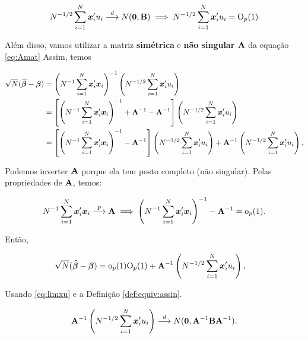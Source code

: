 \documentclass[11pt, oneside, a4paper, article]{article}
\numberwithin{equation}{section}
\begin{document}
\vspace{-1 em}
\begin{align} \label{eq:limxu}
N^{-1/2} \sum_{i=1}^{N} \boldsymbol{x}_{i}' u_{i}  \overset{d}{\longrightarrow}  N(\boldsymbol{0}, \mathbf{B})
\implies
N^{-1/2} \sum_{i=1}^{N} \boldsymbol{x}_{i}' u_{i} = \text{O}_{p}(1)
\end{align}

\vspace{1 em}
Além disso, vamos utilizar a matriz \textbf{simétrica} e \textbf{não singular} $\mathbf{A}$ da equação \eqref{eq:Amat}
Assim, temos 

\vspace{-1 em}
\begin{align*}
\sqrt{N} (\widehat{\boldsymbol{\beta}} - \boldsymbol{\beta}) &=
\left( N^{-1} \sum_{i=1}^{N} \boldsymbol{x}_{i}' \boldsymbol{x}_{i} \right)^{-1}
\left( N^{-1/2} \sum_{i=1}^{N} \boldsymbol{x}_{i}' u_{i} \right)
\\ &=
\left[ 
\left( N^{-1} \sum_{i=1}^{N} \boldsymbol{x}_{i}' \boldsymbol{x}_{i} \right)^{-1} 
+ \mathbf{A}^{-1} - \mathbf{A}^{-1}
\right]
\left( N^{-1/2} \sum_{i=1}^{N} \boldsymbol{x}_{i}' u_{i} \right)
\\ &=
\left[ 
\left( N^{-1} \sum_{i=1}^{N} \boldsymbol{x}_{i}' \boldsymbol{x}_{i} \right)^{-1} 
- \mathbf{A}^{-1}
\right]
\left( N^{-1/2} \sum_{i=1}^{N} \boldsymbol{x}_{i}' u_{i} \right)
+ \mathbf{A}^{-1} 
\left( N^{-1/2} \sum_{i=1}^{N} \boldsymbol{x}_{i}' u_{i} \right),
\end{align*}

\noident
Podemos inverter $\mathbf{A}$ porque ela tem posto completo (não singular).
Pelas propriedades de $\mathbf{A}$, temos:

\vspace{-1 em}
\begin{align*}
N^{-1} \sum_{i=1}^{N} \boldsymbol{x}_{i}' \boldsymbol{x}_{i}  \overset{p}{\longrightarrow}  \mathbf{A}
\implies
\left( N^{-1} \sum_{i=1}^{N} \boldsymbol{x}_{i}' \boldsymbol{x}_{i} \right)^{-1}  - \mathbf{A}^{-1} = \text{o}_{p}(1).
\end{align*}

Então,

\vspace{-1 em}
\begin{align*}
\sqrt{N} (\widehat{\boldsymbol{\beta}} - \boldsymbol{\beta}) &=
\text{o}_{p}(1) \text{O}_{p}(1)
+ \mathbf{A}^{-1} \left( N^{-1/2} \sum_{i=1}^{N} \boldsymbol{x}_{i}' u_{i} \right),
\end{align*}

Usando \eqref{eq:limxu} e a Definição \ref{def:equiv:assin}.

\begin{align*}
\mathbf{A}^{-1} \left( N^{-1/2} \sum_{i=1}^{N} \boldsymbol{x}_{i}' u_{i} \right)
 \overset{d}{\longrightarrow}  
N(\boldsymbol{0}, \mathbf{A}^{-1} \mathbf{B} \mathbf{A}^{-1}).
\end{align*}
\end{document}
